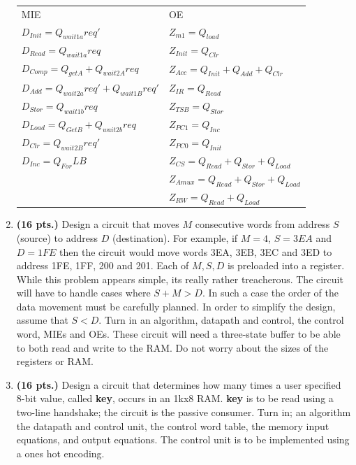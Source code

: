 \begin{enumerate}
\begin{solution}
{\begin{tabular}{ll}
MIE                                     &       OE                      \\
$D_{Init}= Q_{wait1a}req'$            &  $Z_{m1} = Q_{load}$           \\
$D_{Read } = Q_{wait1a}req$             &  $Z_{Init} = Q_{Clr}$           \\
$D_{Comp}= Q_{getA} + Q_{wait2A}req$  &  $Z_{Acc} = Q_{Init} + Q_{Add} + Q_{Clr}$               \\
$D_{Add}= Q_{wait2a}req' + Q_{wait1B}req'$   &  $Z_{IR} = Q_{Read}$     \\
$D_{Stor} = Q_{wait1b}req$             &  $Z_{TSB} = Q_{Stor}$         \\
$D_{Load}= Q_{GetB} + Q_{wait2b}req$  &  $Z_{PC1} = Q_{Inc}$          \\
$D_{Clr  } = Q_{wait2B}req'$            &  $Z_{PC0} = Q_{Init}$          \\
$D_{Inc } = Q_{For}LB$                 &   $Z_{CS} = Q_{Read}+Q_{Stor}+Q_{Load}$     \\
					&   $Z_{Amux} = Q_{Read}+Q_{Stor}+Q_{Load}$   \\
					&   $Z_{RW} = Q_{Read}+Q_{Load}$            \\
\end{tabular}

}\end{solution}

\item {\bf (16 pts.)}
Design a circuit that moves $M$ consecutive words from address $S$ (source) to
address $D$ (destination).  For example, if $M=4$, $S=3EA$ and $D=1FE$ then the 
circuit would move words 3EA, 3EB, 3EC and 3ED to address 1FE, 1FF, 200 and 201.
Each of $M,S,D$ is preloaded into a register.  While this problem appears simple,
its really rather treacherous.  The circuit will have to handle cases where 
$S+M > D$.  In such a case the order of the data movement must be carefully planned.
In order to simplify the design, assume that $S<D$.  Turn in an algorithm, 
datapath and control, the 
control word, MIEs and OEs.  These circuit will need a three-state buffer to
be able to both read and write to the RAM.  Do not worry about the sizes of the
registers or RAM.

\item {\bf (16 pts.)}
Design a circuit that determines how many times a user
specified 8-bit value, called {\bf key}, occurs in an 1kx8 RAM.  
{\bf key} is to be read using a two-line handshake; the circuit 
is the passive consumer.
Turn in; an algorithm
the datapath and control unit,
the control word table,
the memory input equations, and
output equations.  
The control unit is to be implemented using a ones hot encoding.


\end{enumerate}
